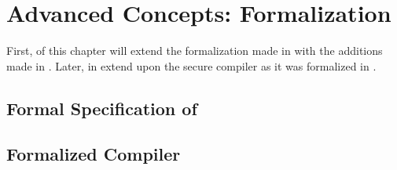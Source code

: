 \chapter{Advanced Concepts: Formalization}

First,  of this chapter will extend the formalization made in  with the additions made in .
Later, in  extend upon the secure compiler as it was formalized in .

\section{Formal Specification of \MiniML}
\label{sec:formalspec2}

\section{Formalized Compiler}
\label{sec:formalizedcompiler2}
